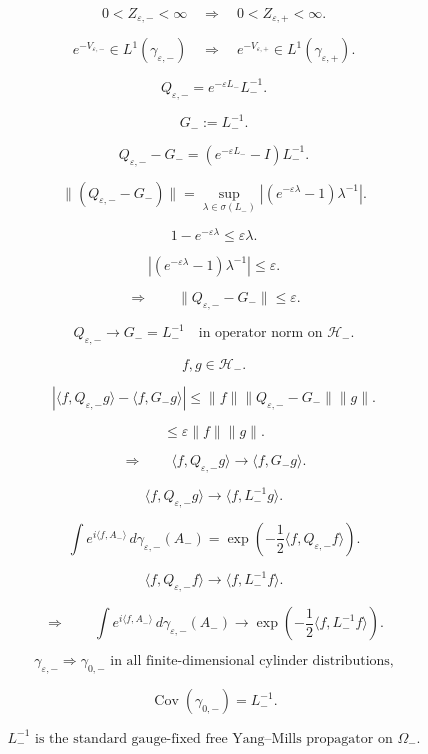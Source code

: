 \documentclass[11pt]{article}
\begin{document}
\[
0<Z_{\varepsilon,-}<\infty
\quad\Longrightarrow\quad
0<Z_{\varepsilon,+}<\infty.
\]

\[
e^{-V_{\varepsilon,-}}\in L^1(\gamma_{\varepsilon,-})
\quad\Longrightarrow\quad
e^{-V_{\varepsilon,+}}\in L^1(\gamma_{\varepsilon,+}).
\]

\[
Q_{\varepsilon,-}
=
e^{-\varepsilon L_-}L_-^{-1}.
\]

\[
G_-:=L_-^{-1}.
\]

\[
Q_{\varepsilon,-}-G_-
=
(e^{-\varepsilon L_-}-I)L_-^{-1}.
\]

\[
\|(Q_{\varepsilon,-}-G_-)\|
=
\sup_{\lambda\in\sigma(L_-)}
\left|
(e^{-\varepsilon\lambda}-1)\lambda^{-1}
\right|.
\]

\[
1-e^{-\varepsilon\lambda}
\le
\varepsilon\lambda.
\]

\[
\left|
(e^{-\varepsilon\lambda}-1)\lambda^{-1}
\right|
\le
\varepsilon.
\]

\[
\Longrightarrow
\qquad
\|Q_{\varepsilon,-}-G_-\|
\le
\varepsilon.
\]

\[
\boxed{
Q_{\varepsilon,-}\to G_-=L_-^{-1}
\quad
\text{in operator norm on }\mathcal H_-.
}
\]

\[
f,g\in\mathcal H_-.
\]

\[
\left|
\langle f,Q_{\varepsilon,-}g\rangle
-
\langle f,G_-g\rangle
\right|
\le
\|f\|\|Q_{\varepsilon,-}-G_-\|\|g\|.
\]

\[
\le
\varepsilon\|f\|\|g\|.
\]

\[
\Longrightarrow
\qquad
\langle f,Q_{\varepsilon,-}g\rangle
\to
\langle f,G_-g\rangle.
\]

\[
\boxed{
\langle f,Q_{\varepsilon,-}g\rangle
\to
\langle f,L_-^{-1}g\rangle.
}
\]

\[
\int e^{i\langle f,A_-\rangle}\,d\gamma_{\varepsilon,-}(A_-)
=
\exp\left(
-\frac12
\langle f,Q_{\varepsilon,-}f\rangle
\right).
\]

\[
\langle f,Q_{\varepsilon,-}f\rangle
\to
\langle f,L_-^{-1}f\rangle.
\]

\[
\Longrightarrow
\qquad
\int e^{i\langle f,A_-\rangle}\,d\gamma_{\varepsilon,-}(A_-)
\to
\exp\left(
-\frac12
\langle f,L_-^{-1}f\rangle
\right).
\]

\[
\boxed{
\gamma_{\varepsilon,-}
\Longrightarrow
\gamma_{0,-}
\text{ in all finite-dimensional cylinder distributions,}
}
\]

\[
\boxed{
\operatorname{Cov}(\gamma_{0,-})=L_-^{-1}.
}
\]

\[
\boxed{
L_-^{-1}
\text{ is the standard gauge-fixed free Yang--Mills propagator on }\Omega_-.
}
\]
\end{document}
